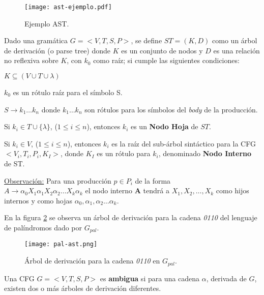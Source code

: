 \begin{figure}[!ht]\centering
\texttt{[image: ast-ejemplo.pdf]}
\caption{\label{ejem-ast} Ejemplo AST.}
\end{figure}

\begin{definition}
\label{def:arbolderivacion}
Dado una gramática $G = < V,T,S,P>$, se define $ST = (K,D)$ como un árbol de derivación (o parse tree) donde $K$ es un conjunto de nodos y $D$ es una relación no reflexiva sobre $K$, con $k_0$ como raíz; si cumple las siguientes condiciones:

\begin{items}
\item $ K \subseteq (V \cup T \cup \lambda) $
\item $k_{0}$ es un rótulo raíz para el símbolo S.
\item $ S \rightarrow k_{1} \ldots k_{n} $ donde $k_{1} \ldots k_{n}$ son rótulos para los símbolos del \textit{body} de la producción.
\item Si $k_{i} \in T \cup \{\lambda\}$, ($1 \leq i \leq n$), entonces $k_{i}$ es un \textbf{Nodo Hoja} de $ST$. 
\item Si $k_{i} \in V$,  ($1 \leq i \leq n$), entonces $k_{i}$ es la raíz del 
      sub-árbol sintáctico para la CFG $<V_{i},T_{i},P_{i},K_I>$, donde $K_{I}$ es un rótulo para $k_{i}$, denominado \textbf{Nodo Interno} de ST.
\end{items}
\end{definition}

\underline{Observación:} Para una producción $p\in P_{i}$ de la forma\\
$A\rightarrow \alpha_{0}X_{1}\alpha_{1}X_{2}\alpha_{2} \ldots X_{k}\alpha_{k}$ el nodo interno \textbf{A} tendrá a $X_{1}, X_{2},\dots, X_{k}$ como hijos internos y como hojas $\alpha_{0}, \alpha_{1}, \alpha_{2} \ldots \alpha_{k}$.

En la figura \ref{fig:ejePala-st} se observa un árbol de derivación para la cadena \textit{0110} del lenguaje de palíndromos dado por $G_{pal}$.

\begin{figure}[!ht]\centering
\texttt{[image: pal-ast.png]}
\caption{\label{fig:ejePala-st} Árbol de derivación para la cadena \textit{0110} en $G_{pal}$.}
\end{figure}


\begin{definition} Una CFG $G = <V,T,S,P>$ es \textbf{ambigua} si para una cadena $\alpha$, derivada de $G$, existen dos o más árboles de derivación diferentes.
\label{def:ambigua}
\end{definition}

